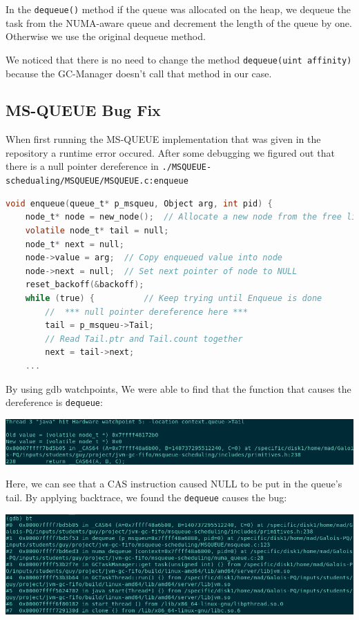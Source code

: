 \documentclass{article}
\begin{document}
 In the \lstinline{dequeue()} method if the queue was allocated on the heap, we dequeue the task from the NUMA-aware queue and decrement the length of the queue by one. Otherwise we use the original dequeue method.

 We noticed that there is no need to change the method \lstinline{dequeue(uint affinity)} because the GC-Manager doesn't call that method in our case.

 \subsection{MS-QUEUE Bug Fix}

 When first running the MS-QUEUE implementation that was given in the repository a runtime error occured. After some debugging we figured out that there is a null pointer dereference in \texttt{./MSQUEUE-schedualing/MSQUEUE/MSQUEUE.c:enqueue}

 \begin{lstlisting}[language=C]
 void enqueue(queue_t* p_msqueu, Object arg, int pid) {
	node_t* node = new_node();	// Allocate a new node from the free list
	volatile node_t* tail = null;
	node_t* next = null;
	node->value = arg;	// Copy enqueued value into node
	node->next = null;	// Set next pointer of node to NULL
	reset_backoff(&backoff);
	while (true) {			// Keep trying until Enqueue is done
		//  *** null pointer dereference here ***
		tail = p_msqueu->Tail; 
		// Read Tail.ptr and Tail.count together
		next = tail->next;	
	...
 \end{lstlisting}

By using gdb watchpoints, We were able to find that the function that causes the dereference is \texttt{dequeue}:

\includegraphics[width=\textwidth]{watchpoint.png}

Here, we can see that a CAS instruction caused NULL to be put in the queue's tail.
By applying backtrace, we found the \texttt{dequeue} causes the bug:

\includegraphics[width=\textwidth]{bt.png}
\end{document}
